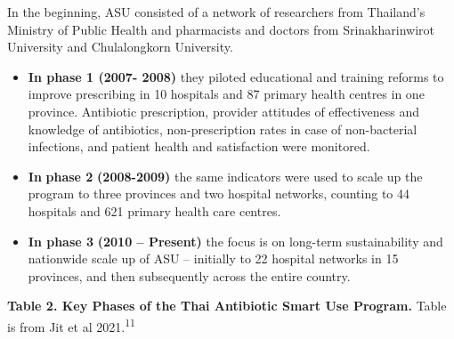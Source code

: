 \documentclass[
  11pt,
  paper=a4,
  ,captions=tableheading
]{scrartcl}
\begin{document}
In the beginning, ASU consisted of a network of researchers from
Thailand's Ministry of Public Health and pharmacists and doctors from
Srinakharinwirot University and Chulalongkorn University.

\begin{itemize}
\item
  \textbf{In phase 1 (2007- 2008)} they piloted educational and training
  reforms to improve prescribing in 10 hospitals and 87 primary health
  centres in one province. Antibiotic prescription, provider attitudes
  of effectiveness and knowledge of antibiotics, non-prescription rates
  in case of non-bacterial infections, and patient health and
  satisfaction were monitored.
\item
  \textbf{In} \textbf{phase 2} \textbf{(2008-2009)} the same indicators
  were used to scale up the program to three provinces and two hospital
  networks, counting to 44 hospitals and 621 primary health care
  centres.
\item
  \textbf{In phase 3} \textbf{(2010 -- Present)} the focus is on
  long-term sustainability and nationwide scale up of ASU -- initially
  to 22 hospital networks in 15 provinces, and then subsequently across
  the entire country.
\end{itemize}

\textbf{Table 2. Key Phases of the Thai Antibiotic Smart Use Program.}
Table is from Jit et al 2021.\textsuperscript{11}
\end{document}
